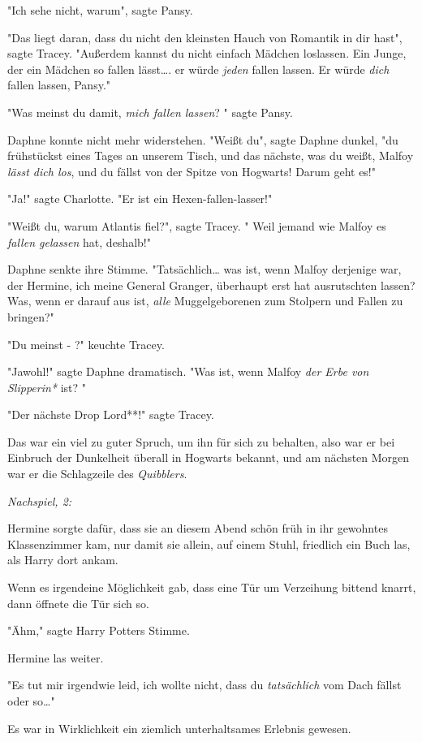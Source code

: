 {"Ich sehe nicht, warum", sagte Pansy.

"Das liegt daran, dass du nicht den kleinsten Hauch von Romantik in dir hast", sagte Tracey. "Außerdem kannst du nicht einfach Mädchen loslassen. Ein Junge, der ein Mädchen so fallen lässt…. er würde \emph{jeden} fallen lassen. Er würde \emph{dich} fallen lassen, Pansy."

"Was meinst du damit, \emph{mich fallen lassen}? " sagte Pansy.

Daphne konnte nicht mehr widerstehen. "Weißt du", sagte Daphne dunkel, "du frühstückst eines Tages an unserem Tisch, und das nächste, was du weißt, Malfoy \emph{lässt dich los}, und du fällst von der Spitze von Hogwarts! Darum geht es!"

"Ja!" sagte Charlotte. "Er ist ein Hexen-fallen-lasser!"

"Weißt du, warum Atlantis fiel?", sagte Tracey. " Weil jemand wie Malfoy es \emph{fallen gelassen} hat, deshalb!"

Daphne senkte ihre Stimme. "Tatsächlich… was ist, wenn Malfoy derjenige war, der Hermine, ich meine General Granger, überhaupt erst hat ausrutschten lassen? Was, wenn er darauf aus ist, \emph{alle} Muggelgeborenen zum Stolpern und Fallen zu bringen?"

"Du meinst - ?" keuchte Tracey.

"Jawohl!" sagte Daphne dramatisch. "Was ist, wenn Malfoy \emph{der Erbe von} \emph{Slipperin*} ist? "

"Der nächste Drop Lord**!" sagte Tracey.

Das war ein viel zu guter Spruch, um ihn für sich zu behalten, also war er bei Einbruch der Dunkelheit überall in Hogwarts bekannt, und am nächsten Morgen war er die Schlagzeile des \emph{Quibblers}.

\emph{Nachspiel, 2:}

Hermine sorgte dafür, dass sie an diesem Abend schön früh in ihr gewohntes Klassenzimmer kam, nur damit sie allein, auf einem Stuhl, friedlich ein Buch las, als Harry dort ankam.

Wenn es irgendeine Möglichkeit gab, dass eine Tür um Verzeihung bittend knarrt, dann öffnete die Tür sich so.

"Ähm," sagte Harry Potters Stimme.

Hermine las weiter.

"Es tut mir irgendwie leid, ich wollte nicht, dass du \emph{tatsächlich} vom Dach fällst oder so…"

Es war in Wirklichkeit ein ziemlich unterhaltsames Erlebnis gewesen.

}
